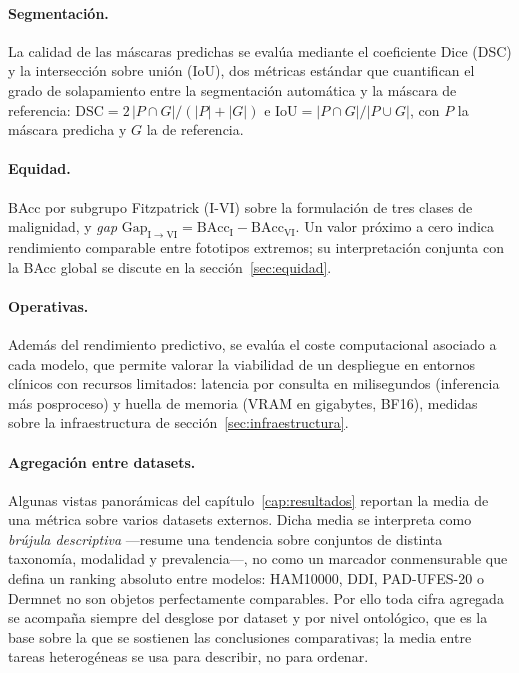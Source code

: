 \paragraph{Segmentación.}
La calidad de las máscaras predichas se evalúa mediante el
coeficiente Dice (DSC) y la intersección sobre unión (IoU), dos
métricas estándar que cuantifican el grado de solapamiento entre la
segmentación automática y la máscara de referencia:
$\mathrm{DSC} = 2\,|P\cap G|/(|P|+|G|)$ e
$\mathrm{IoU} = |P\cap G|/|P\cup G|$, con $P$ la máscara predicha y
$G$ la de referencia.

\paragraph{Equidad.}
BAcc por subgrupo Fitzpatrick (I-VI) sobre la formulación de tres
clases de malignidad, y \emph{gap}
$\mathrm{Gap}_{\mathrm{I}\to\mathrm{VI}}
= \mathrm{BAcc}_{\mathrm{I}} - \mathrm{BAcc}_{\mathrm{VI}}$. Un
valor próximo a cero indica rendimiento comparable entre fototipos
extremos; su interpretación conjunta con la BAcc global se discute en
la sección~\ref{sec:equidad}.

\paragraph{Operativas.}
Además del rendimiento predictivo, se evalúa el coste computacional
asociado a cada modelo, que permite valorar la viabilidad de un
despliegue en entornos clínicos con recursos limitados: latencia por
consulta en milisegundos (inferencia más posproceso) y huella de
memoria (VRAM en gigabytes, BF16), medidas sobre la infraestructura
de sección~\ref{sec:infraestructura}.

\paragraph{Agregación entre datasets.}
\label{sec:agregacion-datasets}
Algunas vistas panorámicas del capítulo~\ref{cap:resultados} reportan
la media de una métrica sobre varios datasets externos. Dicha media se
interpreta como \emph{brújula descriptiva} ---resume una tendencia
sobre conjuntos de distinta taxonomía, modalidad y prevalencia---, no
como un marcador conmensurable que defina un ranking absoluto entre
modelos: HAM10000, DDI, PAD-UFES-20 o Dermnet no son objetos
perfectamente comparables. Por ello toda cifra agregada se acompaña
siempre del desglose por dataset y por nivel ontológico, que es la
base sobre la que se sostienen las conclusiones comparativas; la media
entre tareas heterogéneas se usa para describir, no para ordenar.

